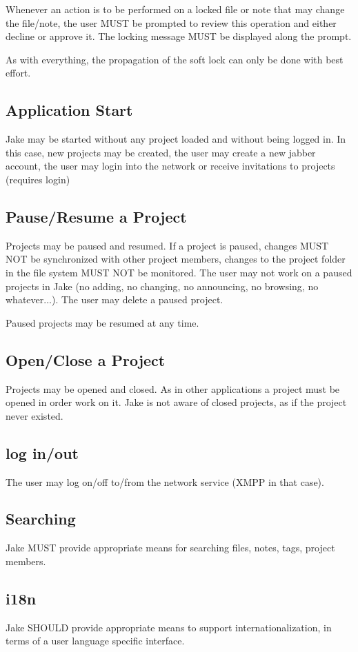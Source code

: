 Whenever an action is to be performed on a locked file or note that may change the file/note, the user MUST be prompted to review this operation and either decline or approve it. The locking message MUST be displayed along the prompt.

As with everything, the propagation of the soft lock can only be done with best effort.

\subsection{Application Start}
Jake may be started without any project loaded and without being logged in. In this case, new projects may be created, the user may create a new jabber account, the user may login into the network or receive invitations to projects (requires login)

\subsection{Pause/Resume a Project}
Projects may be paused and resumed. If a project is paused, changes MUST NOT be synchronized with other project members, changes to the project folder in the file system MUST NOT be monitored. The user may not work on a paused projects in Jake (no adding, no changing, no announcing, no browsing, no whatever...). The user may delete a paused project. 

Paused projects may be resumed at any time.

\subsection{Open/Close a Project}
Projects may be opened and closed. As in other applications a project must be opened in order work on it. Jake is not aware of closed projects, as if the project never existed. 

\subsection{log in/out}
The user may log on/off to/from the network service (XMPP in that case).

\subsection{Searching}
Jake MUST provide appropriate means for searching files, notes, tags, project members.

\subsection{i18n}
Jake SHOULD provide appropriate means to support internationalization, in terms of a user language specific interface.

